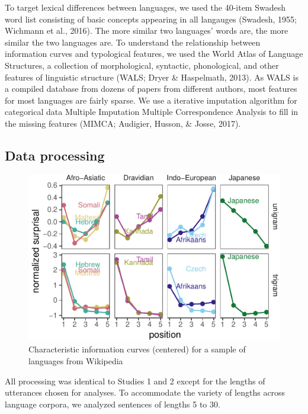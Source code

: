 \documentclass[10pt, letterpaper]{article}
\newenvironment{CodeChunk}{}{}
\begin{document}
To target lexical differences between languages, we used the 40-item
Swadesh word list consisting of basic concepts appearing in all
langauges (Swadesh, 1955; Wichmann et al., 2016). The more similar two
languages' words are, the more similar the two languages are. To
understand the relationship between information curves and typological
features, we used the World Atlas of Language Structures, a collection
of morphological, syntactic, phonological, and other features of
linguistic structure (WALS; Dryer \& Haspelmath, 2013). As WALS is a
compiled database from dozens of papers from different authors, most
features for most languages are fairly sparse. We use a iterative
imputation algorithm for categorical data Multiple Imputation Multiple
Correspondence Analysis to fill in the missing features (MIMCA;
Audigier, Husson, \& Josse, 2017).

\hypertarget{data-processing-1}{%
\subsection{Data processing}\label{data-processing-1}}

\begin{CodeChunk}
\begin{figure}[tb]
\includegraphics{figs/diff-languages-1} \caption[Characteristic information curves (centered) for a sample of languages from Wikipedia]{Characteristic information curves (centered) for a sample of languages from Wikipedia}\label{fig:diff-languages}
\end{figure}
\end{CodeChunk}

All processing was identical to Studies 1 and 2 except for the lengths
of utterances chosen for analyses. To accommodate the variety of lengths
across language corpora, we analyzed sentences of lengths 5 to 30.
\end{document}
